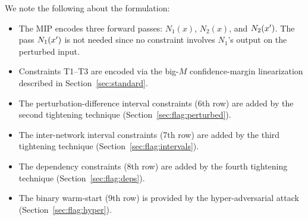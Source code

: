 We note the following about the formulation:
\begin{itemize}
  \item The MIP encodes three forward passes: $N_1(x)$, $N_2(x)$, and $N_2(x')$. The pass $N_1(x')$ is not needed since no constraint involves $N_1$'s output on the perturbed input.
  \item Constraints T1--T3 are encoded via the big-$M$ confidence-margin linearization described in Section~\ref{sec:standard}.
  \item The perturbation-difference interval constraints (6th row) are added by the second tightening technique (Section~\ref{sec:flag:perturbed}).
  \item The inter-network interval constraints (7th row) are added by the third tightening technique (Section~\ref{sec:flag:intervals}).
  \item The dependency constraints (8th row) are added by the fourth tightening technique (Section~\ref{sec:flag:deps}).
  \item The binary warm-start (9th row) is provided by the hyper-adversarial attack (Section~\ref{sec:flag:hyper}).
\end{itemize}
